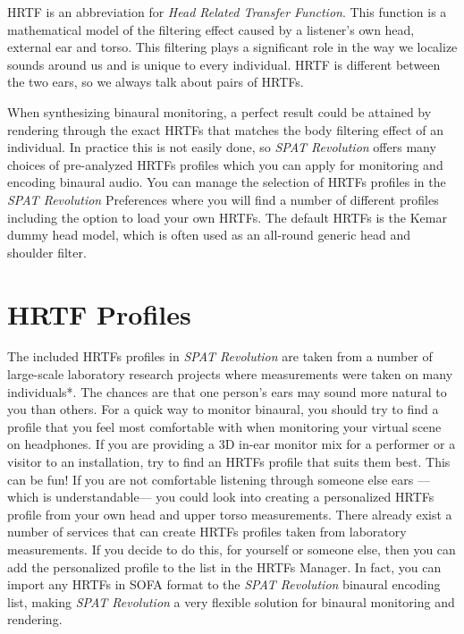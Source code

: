 \documentclass[
  letterpaper,
  DIV=11,
  numbers=noendperiod]{scrreport}
\begin{document}
HRTF is an abbreviation for \emph{Head Related Transfer Function}. This
function is a mathematical model of the filtering effect caused by a
listener's own head, external ear and torso. This filtering plays a
significant role in the way we localize sounds around us and is unique
to every individual. HRTF is different between the two ears, so we
always talk about pairs of HRTFs.

When synthesizing binaural monitoring, a perfect result could be
attained by rendering through the exact HRTFs that matches the body
filtering effect of an individual. In practice this is not easily done,
so \emph{SPAT Revolution} offers many choices of pre-analyzed HRTFs
profiles which you can apply for monitoring and encoding binaural audio.
You can manage the selection of HRTFs profiles in the \emph{SPAT
Revolution} Preferences where you will find a number of different
profiles including the option to load your own HRTFs. The default HRTFs
is the Kemar dummy head model, which is often used as an all-round
generic head and shoulder filter.

\hypertarget{hrtf-profiles}{%
\section{HRTF Profiles}\label{hrtf-profiles}}

The included HRTFs profiles in \emph{SPAT Revolution} are taken from a
number of large-scale laboratory research projects where measurements
were taken on many individuals*. The chances are that one person's ears
may sound more natural to you than others. For a quick way to monitor
binaural, you should try to find a profile that you feel most
comfortable with when monitoring your virtual scene on headphones. If
you are providing a 3D in-ear monitor mix for a performer or a visitor
to an installation, try to find an HRTFs profile that suits them best.
This can be fun! If you are not comfortable listening through someone
else ears ---which is understandable--- you could look into creating a
personalized HRTFs profile from your own head and upper torso
measurements. There already exist a number of services that can create
HRTFs profiles taken from laboratory measurements. If you decide to do
this, for yourself or someone else, then you can add the personalized
profile to the list in the HRTFs Manager. In fact, you can import any
HRTFs in SOFA format to the \emph{SPAT Revolution} binaural encoding
list, making \emph{SPAT Revolution} a very flexible solution for
binaural monitoring and rendering.
\end{document}
